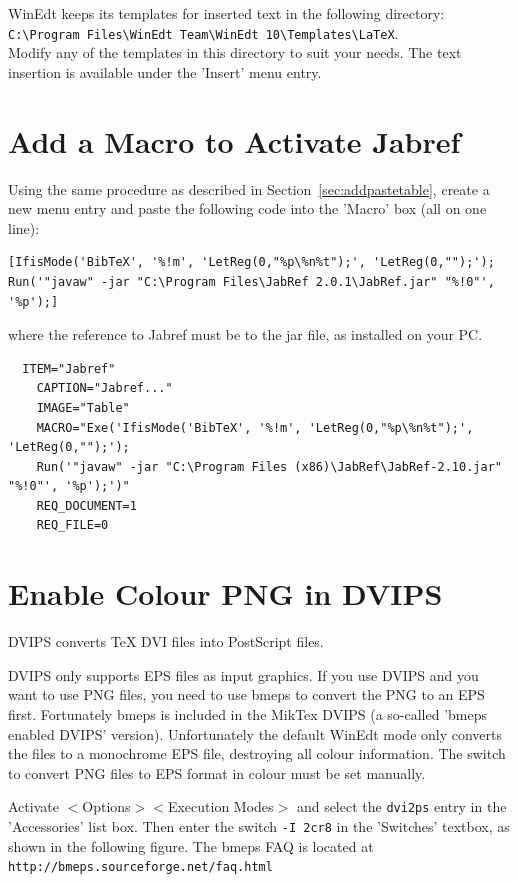WinEdt keeps its templates for inserted text in the following directory:\\
\verb+C:\Program Files\WinEdt Team\WinEdt 10\Templates\LaTeX+.\\
Modify any of the templates in this directory to suit your needs.  The text insertion is available under the 'Insert' menu entry.


\section{Add a Macro to Activate Jabref}

Using the same procedure as described in Section~\ref{sec:addpastetable}, create a new menu entry and paste the following code into the 'Macro' box (all on one line):

{\footnotesize
\begin{verbatim}
[IfisMode('BibTeX', '%!m', 'LetReg(0,"%p\%n%t");', 'LetReg(0,"");');
Run('"javaw" -jar "C:\Program Files\JabRef 2.0.1\JabRef.jar" "%!0"', '%p');]
\end{verbatim}
}

where the reference to Jabref must be to the jar file, as installed on your PC.

{\footnotesize
\begin{verbatim}
  ITEM="Jabref"
    CAPTION="Jabref..."
    IMAGE="Table"
    MACRO="Exe('IfisMode('BibTeX', '%!m', 'LetReg(0,"%p\%n%t");', 'LetReg(0,"");');
    Run('"javaw" -jar "C:\Program Files (x86)\JabRef\JabRef-2.10.jar" "%!0"', '%p');')"
    REQ_DOCUMENT=1
    REQ_FILE=0
\end{verbatim}
}


\section{Enable Colour PNG in DVIPS}

DVIPS converts \TeX{} DVI files into PostScript files.

DVIPS only supports EPS files as input graphics. If you use DVIPS and you want to use PNG files, you need to use bmeps to convert the PNG to an EPS first. Fortunately bmeps is included in the MikTex DVIPS (a so-called 'bmeps enabled DVIPS' version).  Unfortunately the default WinEdt mode only converts the files to a monochrome EPS file, destroying all colour information.  The switch to convert PNG files to EPS format in colour must be set manually.

Activate
$<$Options$>$$<$Execution Modes$>$ and select the \lstinline{dvi2ps} entry in the 'Accessories' list box. Then enter the switch \verb"-I 2cr8" in the 'Switches' textbox, as shown in the following figure.  The bmeps FAQ is located at \verb"http://bmeps.sourceforge.net/faq.html"

